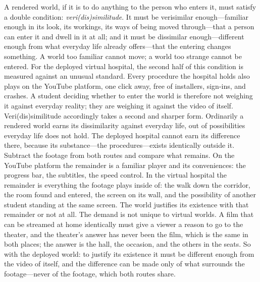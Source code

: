 A rendered world, if it is to do anything to the person who enters it,
must satisfy a double condition: \textit{veri(dis)similitude}. It must
be verisimilar enough---familiar enough in its look, its workings, its
ways of being moved through---that a person can enter it and dwell in
it at all; and it must be dissimilar enough---different enough from
what everyday life already offers---that the entering changes
something. A world too familiar cannot move; a world too strange
cannot be entered. For the deployed virtual hospital, the second half
of this condition is measured against an unusual standard. Every
procedure the hospital holds also plays on the YouTube platform, one
click away, free of installers, sign-ins, and crashes. A student
deciding whether to enter the world is therefore not weighing it
against everyday reality; they are weighing it against the video of
itself. Veri(dis)similitude accordingly takes a second and sharper form.
Ordinarily a rendered world earns its dissimilarity against everyday
life, out of possibilities everyday life does not hold. The deployed hospital
cannot earn its difference there, because its substance---the
procedures---exists identically outside it. Subtract the footage from
both routes and compare what remains. On the YouTube platform the
remainder is a familiar player and its conveniences: the progress bar,
the subtitles, the speed control. In the virtual hospital the
remainder is everything the footage plays inside of: the walk down the
corridor, the room found and entered, the screen on its wall, and the
possibility of another student standing at the same screen. The world
justifies its existence with that remainder or not at all. The demand
is not unique to virtual worlds. A film that can be streamed at home
identically must give a viewer a reason to go to the theater, and the
theater's answer has never been the film, which is the same in both
places; the answer is the hall, the occasion, and the others in the
seats. So with the deployed world: to justify its existence it must be
different enough from the video of itself, and the difference can be
made only of what surrounds the footage---never of the footage, which
both routes share.

